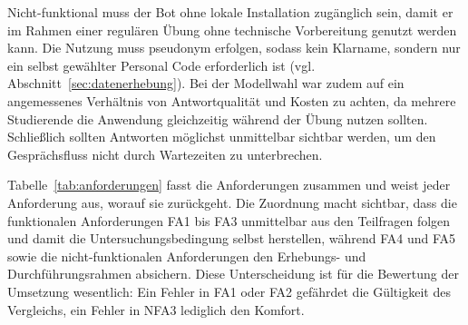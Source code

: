 Nicht-funktional muss der Bot ohne lokale Installation zugänglich sein, damit er im Rahmen einer
regulären Übung ohne technische Vorbereitung genutzt werden kann. Die Nutzung muss pseudonym erfolgen,
sodass kein Klarname, sondern nur ein selbst gewählter Personal Code erforderlich ist (vgl.
Abschnitt~\ref{sec:datenerhebung}). Bei der Modellwahl war zudem auf ein angemessenes Verhältnis
von Antwortqualität und Kosten zu achten, da mehrere Studierende die Anwendung gleichzeitig während
der Übung nutzen sollten. Schließlich sollten Antworten möglichst unmittelbar sichtbar werden, um
den Gesprächsfluss nicht durch Wartezeiten zu unterbrechen.

Tabelle~\ref{tab:anforderungen} fasst die Anforderungen zusammen und weist jeder Anforderung aus,
worauf sie zurückgeht. Die Zuordnung macht sichtbar, dass die funktionalen Anforderungen FA1 bis FA3
unmittelbar aus den Teilfragen folgen und damit die Untersuchungsbedingung selbst herstellen, während
FA4 und FA5 sowie die nicht-funktionalen Anforderungen den Erhebungs- und Durchführungsrahmen
absichern. Diese Unterscheidung ist für die Bewertung der Umsetzung wesentlich: Ein Fehler in FA1
oder FA2 gefährdet die Gültigkeit des Vergleichs, ein Fehler in NFA3 lediglich den Komfort.

